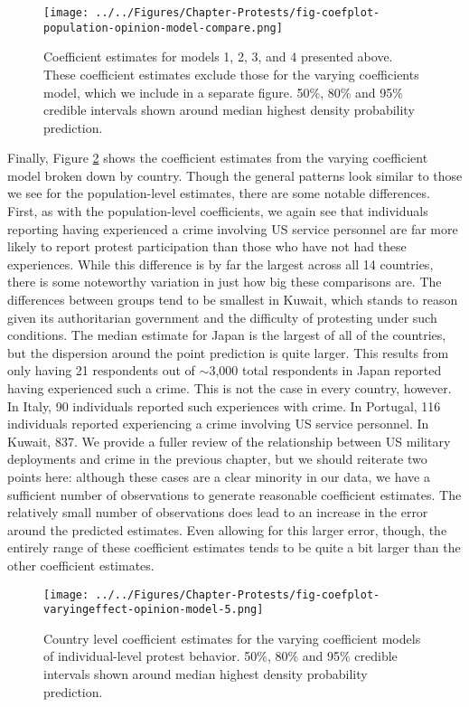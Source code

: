 \begin{figure}[t]
	\centering\texttt{[image: ../../Figures/Chapter-Protests/fig-coefplot-population-opinion-model-compare.png]}
	\caption{Coefficient estimates for models 1, 2, 3, and 4 presented above. These coefficient estimates exclude those for the varying coefficients model, which we include in a separate figure. 50\%, 80\% and 95\% credible intervals shown around median highest density probability prediction.}
	\label{fig:coefplot-population-compare}
\end{figure}

Finally, Figure \ref{fig:coefplot-varying-coefficients} shows the coefficient estimates from the varying coefficient model broken down by country. Though the general patterns look similar to those we see for the population-level estimates, there are some notable differences. First, as with the population-level coefficients, we again see that individuals reporting having experienced a crime involving US service personnel are far more likely to report protest participation than those who have not had these experiences. While this difference is by far the largest across all 14 countries, there is some noteworthy variation in just how big these comparisons are. The differences between groups tend to be smallest in Kuwait, which stands to reason given its authoritarian government and the difficulty of protesting under such conditions.  The median estimate for Japan is the largest of all of the countries, but the dispersion around the point prediction is quite larger. This results from only having 21 respondents out of $\sim$3,000 total respondents in Japan reported having experienced such a crime. This is not the case in every country, however. In Italy, 90 individuals reported such experiences with crime. In Portugal, 116 individuals reported experiencing a crime involving US service personnel. In Kuwait, 837. We provide a fuller review of the relationship between US military deployments and crime in the previous chapter, but we should reiterate two points here: although these cases are a clear minority in our data, we have a sufficient number of observations to generate reasonable coefficient estimates. The relatively small number of observations does lead to an increase in the error around the predicted estimates. Even allowing for this larger error, though, the entirely range of these coefficient estimates tends to be quite a bit larger than the other coefficient estimates. 




\begin{figure}[t]
	\centering\texttt{[image: ../../Figures/Chapter-Protests/fig-coefplot-varyingeffect-opinion-model-5.png]}
	\caption{Country level coefficient estimates for the varying coefficient models of individual-level protest behavior. 50\%, 80\% and 95\% credible intervals shown around median highest density probability prediction.}
	\label{fig:coefplot-varying-coefficients}
\end{figure}


